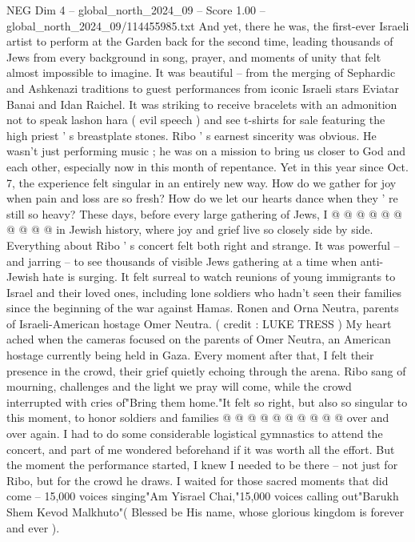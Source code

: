 \begin{textsample}{NEG Dim 4 – global\_north\_2024\_09 – Score 1.00 – global\_north\_2024\_09/114455985.txt}  \label{ex:f4_neg_137}
And yet, there he was, the first-ever Israeli artist to perform at the Garden back for the second time, leading thousands of Jews from every background in song, prayer, and moments of unity that felt almost impossible to imagine.
It was beautiful -- from the merging of Sephardic and Ashkenazi traditions to guest performances from iconic Israeli stars Eviatar Banai and Idan Raichel.
It was striking to receive bracelets with an admonition not to speak lashon hara ( evil speech ) and see t-shirts for sale featuring the high priest ' s breastplate stones.
Ribo ' s earnest sincerity was obvious.
He wasn't just performing music ; he was on a mission to bring us closer to God and each other, especially now in this month of repentance.
Yet in this year since Oct. 7, the experience felt singular in an entirely new way.
How do we gather for joy when pain and loss are so fresh?
How do we let our hearts dance when they ' re still so heavy?
These days, before every large gathering of Jews, I @ @ @ @ @ @ @ @ @ @ in Jewish history, where joy and grief live so closely side by side.
Everything about Ribo ' s concert felt both right and strange.
It was powerful -- and jarring -- to see thousands of visible Jews gathering at a time when anti-Jewish hate is surging.
It felt surreal to watch reunions of young immigrants to Israel and their loved ones, including lone soldiers who hadn't seen their families since the beginning of the war against Hamas.
Ronen and Orna Neutra, parents of Israeli-American hostage Omer Neutra. ( credit : LUKE TRESS ) My heart ached when the cameras focused on the parents of Omer Neutra, an American hostage currently being held in Gaza.
Every moment after that, I felt their presence in the crowd, their grief quietly echoing through the arena.
Ribo sang of mourning, challenges and the light we pray will come, while the crowd interrupted with cries of"Bring them home."It felt so right, but also so singular to this moment, to honor soldiers and families @ @ @ @ @ @ @ @ @ @ over and over again.
I had to do some considerable logistical gymnastics to attend the concert, and part of me wondered beforehand if it was worth all the effort.
But the moment the performance started, I knew I needed to be there -- not just for Ribo, but for the crowd he draws.
I waited for those sacred moments that did come -- 15,000 voices singing"Am Yisrael Chai,"15,000 voices calling out"Barukh Shem Kevod Malkhuto"( Blessed be His name, whose glorious kingdom is forever and ever ).

\end{textsample}
